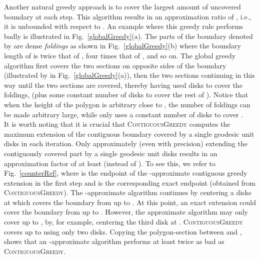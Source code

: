 \documentclass{llncs}
\begin{document}
Another natural greedy approach is to cover the largest amount of uncovered boundary at each step.  This algorithm results in an approximation ratio of , i.e., it is unbounded with respect to . An example where this greedy rule performs badly is illustrated in Fig.~\ref{globalGreedy}(a). The parts of the boundary denoted by  are dense {\em foldings} as shown in Fig.~\ref{globalGreedy}(b) where the boundary length of  is twice that of , four times that of , and so on.  The global greedy algorithm first covers the two  sections on opposite sides of the boundary (illustrated by  in Fig.~\ref{globalGreedy}(a)), then the two  sections continuing in this way until the two  sections are covered, thereby having used  disks to cover the foldings, (plus some constant number of disks to cover the rest of ). Notice that when the height of the polygon is arbitrary close to , the number of foldings can be made arbitrary large, while  only uses a constant number of disks to cover .\\


It is worth noting that it is crucial that  \textsc{ContiguousGreedy}  computes the maximum extension of the contiguous boundary covered by a single geodesic unit disks in each iteration. Only approximately (even with  precision) extending the contiguously covered part by a single geodesic unit disks results in an approximation factor of at least  (instead of ). To see this, we refer to  Fig.~\ref{counterRef}, where  is the endpoint of the -approximate contiguous greedy extension in the first step and  is the corresponding exact endpoint (obtained from \textsc{ContiguousGreedy}). The -approximate algorithm continues by centering a disks at  which covers the boundary from   up to . At this point, an exact extension could cover the boundary from  up to . However, the approximate algorithm may only cover up to , by, for example, centering the third disk at .  \textsc{ContiguousGreedy} covers up to  using only two disks. Copying the polygon-section between  and , shows that an -approximate algorithm performs at least twice as bad as \textsc{ContiguousGreedy}.
\end{document}
